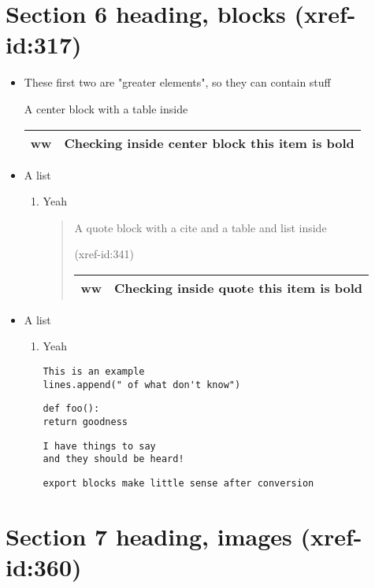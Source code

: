\documentclass[11pt]{article}
\begin{document}
\section{Section 6 heading, blocks   (xref-id:317)  }
 \label{obj-317}
 \label{obj-316}
\begin{itemize}
\item
These first two are "greater elements", so they can contain stuff
\begin{center}
A center block with a table inside

\begin{tabular}{|c|c|}
\hline
 ww  & Checking inside center block \textbf{this item is bold} \\
\hline
\end{tabular}
\end{center}
\item
A list
\begin{enumerate}
\item
Yeah

\begin{quote}
A quote block with a cite and  a table and list inside

 (xref-id:341)
 \label{obj-341}
\begin{tabular}{|c|c|}
\hline
 ww  & Checking inside quote \textbf{this item is bold} \\
\hline
\end{tabular}
\end{quote}
\end{enumerate}
\item
A list
\begin{enumerate}
\item
Yeah

\begin{verbatim}
This is an example
lines.append(" of what don't know")
\end{verbatim}
\begin{verbatim}
def foo():
return goodness
\end{verbatim}
\begin{verbatim}
I have things to say
and they should be heard!
\end{verbatim}
\begin{verbatim}
export blocks make little sense after conversion 
\end{verbatim}
\vspace{\baselineskip}
\end{enumerate}
\end{itemize}
\section{Section 7 heading, images   (xref-id:360)  }
 \label{obj-360}
 \label{obj-359}
\end{document}
